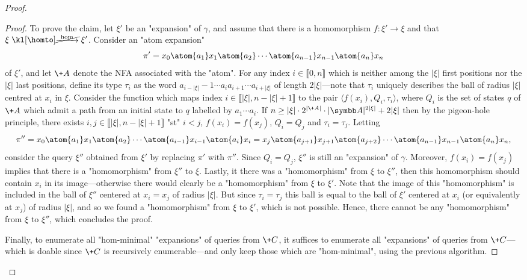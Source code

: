 \begin{proof}
\begin{proof}
        To prove the claim, let $\xi'$ be an "expansion" of $\gamma$, and assume that there is 
        a homomorphism $f\colon \xi' \to \xi$ and that $\xi \nothomto \xi'$. Consider an "atom expansion"
        \[
            \pi' = x_0 \atom{a_1} x_1 \atom{a_2} \cdots \atom{a_{n-1}} x_{n-1} \atom{a_n} x_n
        \]
        of $\xi'$, and let $\+A$ denote the NFA associated with the "atom".
        For any index $i \in \lBrack 0,n\rBrack$ which is neither among the $|\xi|$ first positions
        nor the $|\xi|$ last positions, define its type $\tau_i$ as
        the word $a_{i-|\xi|}-1 \cdots a_i a_{i+1} \cdots a_{i+|\xi|}$ of length $2|\xi|$---note that $\tau_i$ uniquely describes the ball of radius $|\xi|$ centred at $x_i$ in $\xi$.
        Consider the function which maps index $i \in \lBrack |\xi|, n-|\xi|+1\rBrack$
        to the pair $\langle f(x_i), Q_i , \tau_i \rangle$, where $Q_i$ is the set of states $q$
        of $\+A$ which admit a path from an initial state to $q$ labelled by $a_1\cdots a_i$.
        If $n \geq |\xi|\cdot 2^{|\+A|}\cdot |\A|^{2|\xi|} + 2|\xi|$ then by the pigeon-hole principle,
        there exists $i,j \in \lBrack |\xi|, n-|\xi|+1\rBrack$ "st" $i<j$, $f(x_i) = f(x_j)$,
        $Q_i = Q_j$ and $\tau_i = \tau_j$. Letting
        \[
            \pi'' = x_0 \atom{a_1} x_1 \atom{a_2} \cdots \atom{a_{i-1}} x_{i-1} \atom{a_i} x_i = x_j
            \atom{a_{j+1}} x_{j+1} \atom{a_{j+2}} \cdots \atom{a_{n-1}} x_{n-1} \atom{a_n} x_n,
        \]
        consider the query $\xi''$ obtained from $\xi'$ 
        by replacing $\pi'$ with $\pi''$.
        Since $Q_i = Q_j$, $\xi''$ is still an "expansion" of $\gamma$.
        Moreover, $f(x_i) = f(x_j)$ implies that there is a "homomorphism" from $\xi''$ to $\xi$.
        Lastly, it there was a "homomorphism" from $\xi$ to $\xi''$,
        then this homomorphism should contain $x_i$ in its image---otherwise there would clearly be a "homomorphism" from $\xi$ to $\xi'$. Note that the image of this "homomorphism"
        is included in the ball of $\xi''$ centered at $x_i = x_j$ of radius $|\xi|$.
        But since $\tau_i = \tau_j$ this ball is equal to the ball of $\xi'$ centered at $x_i$
        (or equivalently at $x_j$) of radius $|\xi|$, and so we found a "homomorphism" from
        $\xi$ to $\xi'$, which is not possible. Hence, there cannot be any "homomorphism" from
        $\xi$ to $\xi''$, which concludes the proof.

        Finally, to enumerate all "hom-minimal" "expansions" of queries from $\+C$,
        it suffices to enumerate all "expansions" of queries from $\+C$---which is doable since $\+C$ is recursively enumerable---and only keep those which are "hom-minimal", using the previous algorithm.
    \end{proof}


\end{proof}
